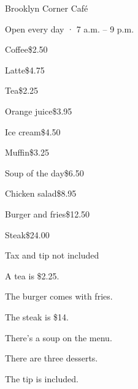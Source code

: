 \begin{anglais}
\begin{tcolorbox}[enhanced,width=124mm,center,colback=otOrangeTint!40,colframe=otOrangeDark!70,boxrule=0.7pt,
  arc=2mm,left=6mm,right=6mm,top=3.5mm,bottom=3.5mm,fontupper=\fontsize{10.4}{13.4}\selectfont]
\begin{center}{\otBold\fontsize{15}{18}\selectfont\color{otInk}Brooklyn Corner Café}\par\vspace{0.6mm}
{\fontsize{8.4}{10}\selectfont\color{otMuted}Open every day · 7 a.m. – 9 p.m.}\end{center}\vspace{1mm}
\begin{minipage}[t]{0.47\linewidth}
{\otSemi\fontsize{8.6}{10}\selectfont\color{otOrangeDark}}\par\vspace{0.8mm}
Coffee\dotfill \$2.50\par Latte\dotfill \$4.75\par Tea\dotfill \$2.25\par Orange juice\dotfill \$3.95\par
{}\par\vspace{0.8mm}
Ice cream\dotfill \$4.50\par Muffin\dotfill \$3.25
\end{minipage}\hfill
\begin{minipage}[t]{0.47\linewidth}
{\otSemi\fontsize{8.6}{10}\selectfont\color{otOrangeDark}}\par\vspace{0.8mm}
Soup of the day\dotfill \$6.50\par Chicken salad\dotfill \$8.95\par Burger and fries\dotfill \$12.50\par
Steak\dotfill \$24.00
\end{minipage}
\par\vspace{2mm}\begin{center}{\fontsize{8.4}{10}\selectfont\color{otMuted}Tax and tip not included}\end{center}
\end{tcolorbox}
\begin{questions}[2]
\item A tea is \$2.25. \hfill{}
\item The burger comes with fries. \hfill{}
\item The steak is \$14. \hfill{}
\item There's a soup on the menu. \hfill{}
\item There are three desserts. \hfill{}
\item The tip is included. \hfill{}
\end{questions}
\end{anglais}

